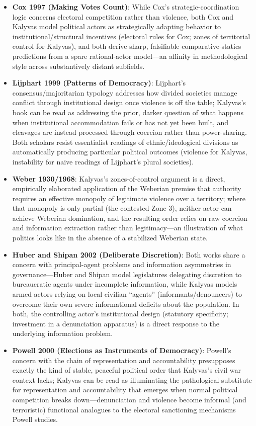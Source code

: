 \documentclass[12pt]{article}
\begin{document}
\begin{itemize}[leftmargin=*, itemsep=4pt]
    \item \textbf{Cox 1997 (Making Votes Count)}: While Cox's strategic-coordination logic concerns electoral competition rather than violence, both Cox and Kalyvas model political actors as strategically adapting behavior to institutional/structural incentives (electoral rules for Cox; zones of territorial control for Kalyvas), and both derive sharp, falsifiable comparative-statics predictions from a spare rational-actor model---an affinity in methodological style across substantively distant subfields.
    \item \textbf{Lijphart 1999 (Patterns of Democracy)}: Lijphart's consensus/majoritarian typology addresses how divided societies manage conflict through institutional design once violence is off the table; Kalyvas's book can be read as addressing the prior, darker question of what happens when institutional accommodation fails or has not yet been built, and cleavages are instead processed through coercion rather than power-sharing. Both scholars resist essentialist readings of ethnic/ideological divisions as automatically producing particular political outcomes (violence for Kalyvas, instability for naive readings of Lijphart's plural societies).
    \item \textbf{Weber 1930/1968}: Kalyvas's zones-of-control argument is a direct, empirically elaborated application of the Weberian premise that authority requires an effective monopoly of legitimate violence over a territory; where that monopoly is only partial (the contested Zone 3), neither actor can achieve Weberian domination, and the resulting order relies on raw coercion and information extraction rather than legitimacy---an illustration of what politics looks like in the absence of a stabilized Weberian state.
    \item \textbf{Huber and Shipan 2002 (Deliberate Discretion)}: Both works share a concern with principal-agent problems and information asymmetries in governance---Huber and Shipan model legislatures delegating discretion to bureaucratic agents under incomplete information, while Kalyvas models armed actors relying on local civilian ``agents'' (informants/denouncers) to overcome their own severe informational deficits about the population. In both, the controlling actor's institutional design (statutory specificity; investment in a denunciation apparatus) is a direct response to the underlying information problem.
    \item \textbf{Powell 2000 (Elections as Instruments of Democracy)}: Powell's concern with the chain of representation and accountability presupposes exactly the kind of stable, peaceful political order that Kalyvas's civil war context lacks; Kalyvas can be read as illuminating the pathological substitute for representation and accountability that emerges when normal political competition breaks down---denunciation and violence become informal (and terroristic) functional analogues to the electoral sanctioning mechanisms Powell studies.

\end{itemize}
\end{document}
